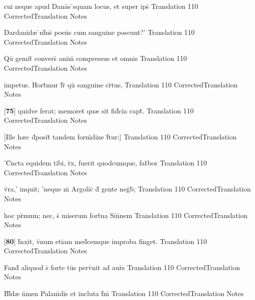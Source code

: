\latline
  {cui neque apud Dana\={}s \={}squam locus, et super ips\={\macron {\i}}}
  { Translation }
  {110}
  { CorrectedTranslation }
  { Notes }


\latline
  {Dardanid{\ae} \={\macron {\i}}nf\={}ns\={\macron {\i}} poen\={}s cum sanguine poscunt?'}
  { Translation }
  {110}
  { CorrectedTranslation }
  { Notes }


\latline
  {Qu\={} gemit\={} convers\={\macron {\i}} anim\={\macron {\i}} compressus et omnis}
  { Translation }
  {110}
  { CorrectedTranslation }
  { Notes }


\latline
  {impetus.  Hort\={}mur f\={}r\={\macron {\i}} qu\={} sanguine cr\={}tus,}
  { Translation }
  {110}
  { CorrectedTranslation }
  { Notes }


\latline
  {[\textbf{75}] quidve ferat; memoret qu{\ae} sit fid\={}cia capt\={}.}
  { Translation }
  {110}
  { CorrectedTranslation }
  { Notes }


\latline
  {[Ille h{\ae}c d\={}posit\={} tandem form\={\macron {\i}}dine f\={}tur:] }
  { Translation }
  {110}
  { CorrectedTranslation }
  { Notes }


\latline
  {'C\={}ncta equidem tibi, r\={}x, fuerit quodcumque, fat\={}bor}
  { Translation }
  {110}
  { CorrectedTranslation }
  { Notes }


\latline
  {v\={}ra,' inquit; 'neque m\={} Argolic\={} d\={} gente neg\={}b\={};}
  { Translation }
  {110}
  { CorrectedTranslation }
  { Notes }


\latline
  {hoc pr\={\macron {\i}}mum; nec, s\={\macron {\i}} miserum fort\={}na Sin\={}nem}
  { Translation }
  {110}
  { CorrectedTranslation }
  { Notes }


\latline
  {[\textbf{80}] f\={\macron {\i}}nxit, v\={}num etiam med\={}cemque improba finget.}
  { Translation }
  {110}
  { CorrectedTranslation }
  { Notes }


\latline
  {Fand\={} aliquod s\={\macron {\i}} forte tu\={}s perv\={}nit ad aur\={\macron {\i}}s}
  { Translation }
  {110}
  { CorrectedTranslation }
  { Notes }


\latline
  {B\={}l\={\macron {\i}}d{\ae} n\={}men Palam\={}dis et incluta f\={}m\={}}
  { Translation }
  {110}
  { CorrectedTranslation }
  { Notes }


